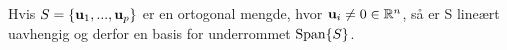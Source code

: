 Hvis $S = \{ \mathbf{u}_1, ..., \mathbf{u}_p\}$ er en ortogonal mengde,
hvor $\mathbf{u}_i \neq 0 \in \mathbb{R}^n$,
så er S lineært uavhengig og derfor en basis for underrommet $\text{Span}\{S\}$.
